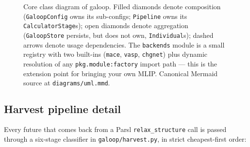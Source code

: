 \documentclass[11pt,letterpaper]{article}
\begin{document}
\begin{figure}[H]
{
}

\caption{Core class diagram of galoop. Filled diamonds denote
composition (\texttt{GaloopConfig} owns its sub-configs;
\texttt{Pipeline} owns its \texttt{CalculatorStage}s); open diamonds
denote aggregation (\texttt{GaloopStore} persists, but does not own,
\texttt{Individual}s); dashed arrows denote usage dependencies. The
\texttt{backends} module is a small registry with two built-ins
(\texttt{mace}, \texttt{vasp}, \texttt{chgnet}) plus dynamic
resolution of any \texttt{pkg.module:factory} import path — this is
the extension point for bringing your own MLIP. Canonical Mermaid
source at \texttt{diagrams/uml.mmd}.}
\label{fig:uml}
\end{figure}

\subsection{Harvest pipeline detail}

Every future that comes back from a Parsl \texttt{relax\_structure}
call is passed through a six-stage classifier in
\texttt{galoop/harvest.py}, in strict cheapest-first order:
\end{document}
